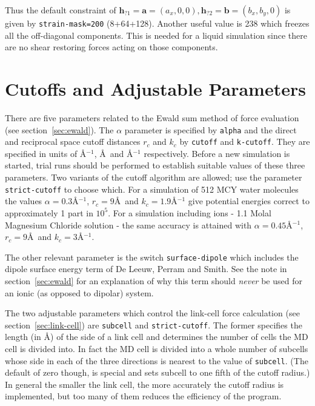 Thus the default constraint of $\bm{h}_{?1} = \bm{a} = (a_x,0,0),
\bm{h}_{?2} = \bm{b} = (b_x,b_y,0)$ is given by \verb'strain-mask=200'
(8+64+128).  Another useful value is 238 which freezes all the
off-diagonal components.  This is needed for a liquid simulation since
there are no shear restoring forces acting on those components.

\section{Cutoffs and Adjustable Parameters}

There are five parameters related to the Ewald sum method of force
evaluation (see section~\ref{sec:ewald}).  The $\alpha$ parameter is
specified by \verb'alpha' and the direct and reciprocal space cutoff
distances $r_{c}$ and $k_{c}$ by \verb'cutoff' and \verb'k-cutoff'.
They are specified in units of \AA$^{-1}$, \AA\ and \AA$^{-1}$
respectively.  Before a new simulation is started, trial runs should
be performed to establish suitable values of these three parameters.
Two variants of the cutoff algorithm are allowed; use the parameter
\verb'strict-cutoff' to choose which.
For a simulation of 512 MCY water molecules the values $\alpha =
0.3$\AA$^{-1}$, $r_{c} = 9$\AA\ and $k_{c} = 1.9$\AA$^{-1}$ give
potential energies correct to approximately 1 part in $10^{5}$. For a
simulation including ions - 1.1 Molal Magnesium Chloride solution -
the same accuracy is attained with $\alpha = 0.45$\AA$^{-1}$, $r_{c} =
9$\AA\ and $k_{c} = 3$\AA$^{-1}$.

The other relevant parameter is the switch \verb'surface-dipole' which
includes the dipole surface energy term of De Leeuw, Perram and
Smith\cite{deleeuw:80}.  See the note in section~\ref{sec:ewald} for an
explanation of why this term should {\em never} be used for an ionic
(as opposed to dipolar) system.

The two adjustable parameters which control the link-cell force
calculation (see section~\ref{sec:link-cell}) are \verb'subcell' and
\verb'strict-cutoff'. The former specifies the length (in \AA) of the side of
a link cell and determines the number of cells the MD cell is divided
into. In fact the MD cell is divided into a whole number of subcells
whose side in each of the three directions is nearest to the value of
\verb'subcell'.  (The default of zero though, is special and sets
subcell to one fifth of the cutoff radius.)  In general the smaller
the link cell, the more accurately the cutoff radius is implemented,
but too many of them reduces the efficiency of the program.

